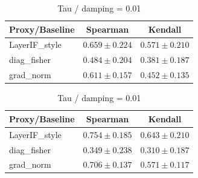 \documentclass[accepted]{uai2026}%
\theoremstyle{remark}%
\begin{document}
\begin{table}[htbp]
    \centering
    
    \begin{minipage}{0.48\textwidth}
        \centering
        \caption{Tau / damping = 0.001}
        \label{tab:tau_0.001}
        \begin{tabular}{lcc}
        \toprule
        Proxy/Baseline & Spearman & Kendall \\
        \midrule
        LayerIF\_style & $0.659 \pm 0.224$ & $0.571 \pm 0.210$ \\
        diag\_fisher & $0.484 \pm 0.204$ & $0.381 \pm 0.187$ \\
        grad\_norm & $0.611 \pm 0.157$ & $0.452 \pm 0.135$ \\
        \bottomrule
        \end{tabular}
    \end{minipage}\hfill
    \begin{minipage}{0.48\textwidth}
        \centering
        \caption{Tau / damping = 0.01}
        \label{tab:tau_0.01}
        \begin{tabular}{lcc}
        \toprule
        Proxy/Baseline & Spearman & Kendall \\
        \midrule
        LayerIF\_style & $0.754 \pm 0.185$ & $0.643 \pm 0.210$ \\
        diag\_fisher & $0.349 \pm 0.238$ & $0.310 \pm 0.187$ \\
        grad\_norm & $0.706 \pm 0.137$ & $0.571 \pm 0.117$ \\
        \bottomrule
        \end{tabular}
    \end{minipage}
    
    \vspace{1.5em}%
    

\end{table}
\end{document}
